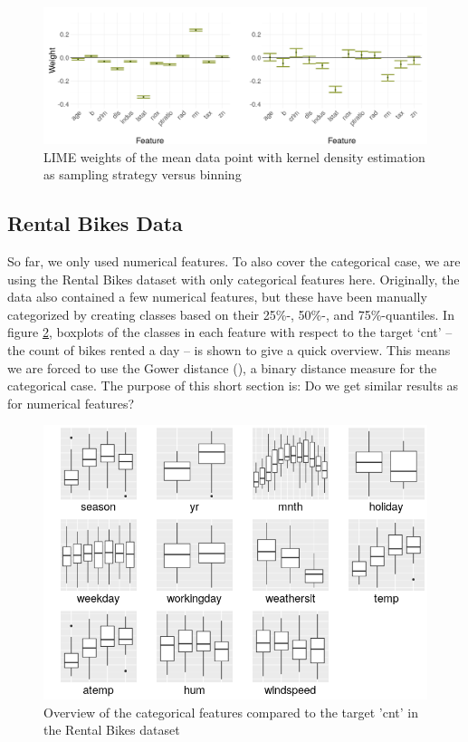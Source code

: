 \documentclass[]{krantz}
\begin{document}
\begin{figure}

{\centering \includegraphics[width=0.99\linewidth]{images/boston_kdeVSbins} 

}

\caption{LIME weights of the mean data point with kernel density estimation as sampling strategy versus binning}\label{fig:figbostkdebin}
\end{figure}

\subsection{Rental Bikes Data}\label{rental-bikes-data}

So far, we only used numerical features. To also cover the categorical
case, we are using the Rental Bikes dataset with only categorical
features here. Originally, the data also contained a few numerical
features, but these have been manually categorized by creating classes
based on their 25\%-, 50\%-, and 75\%-quantiles. In figure
\ref{fig:figbike}, boxplots of the classes in each feature with respect
to the target `cnt' -- the count of bikes rented a day -- is shown to
give a quick overview. This means we are forced to use the Gower
distance (\citet{gower1971general}), a binary distance measure for the
categorical case. The purpose of this short section is: Do we get
similar results as for numerical features?

\begin{figure}

{\centering \includegraphics[width=0.99\linewidth]{images/bikes_prezi} 

}

\caption{Overview of the categorical features compared to the target 'cnt' in the Rental Bikes dataset}\label{fig:figbike}
\end{figure}
\end{document}
